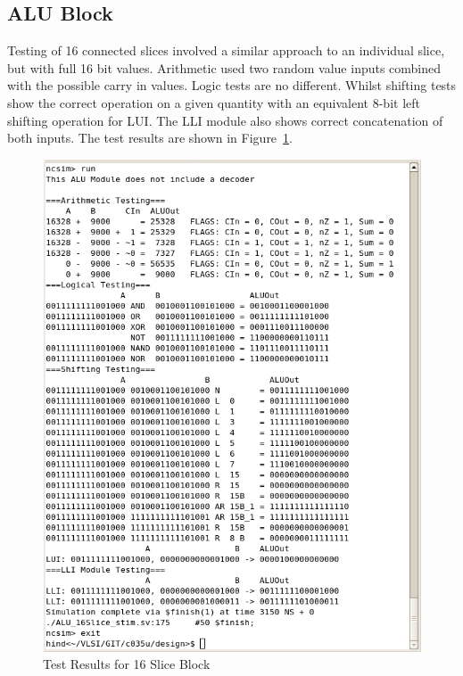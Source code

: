 \subsection{ALU Block}
Testing of 16 connected slices involved a similar approach to an individual slice, but with full 16 bit values. Arithmetic used two random value inputs combined with the possible carry in values. Logic tests are no different. Whilst shifting tests show the correct operation on a given quantity with an equivalent 8-bit left shifting operation for LUI. The LLI module also shows correct concatenation of both inputs. The test results are shown in Figure~\ref{fig:ALUBlockRes}.

\begin{figure}[h]
	\centering
	\includegraphics[scale=0.72]{results/ALUBlock.png}
	\caption{Test Results for 16 Slice Block}
	\label{fig:ALUBlockRes}
\end{figure}
